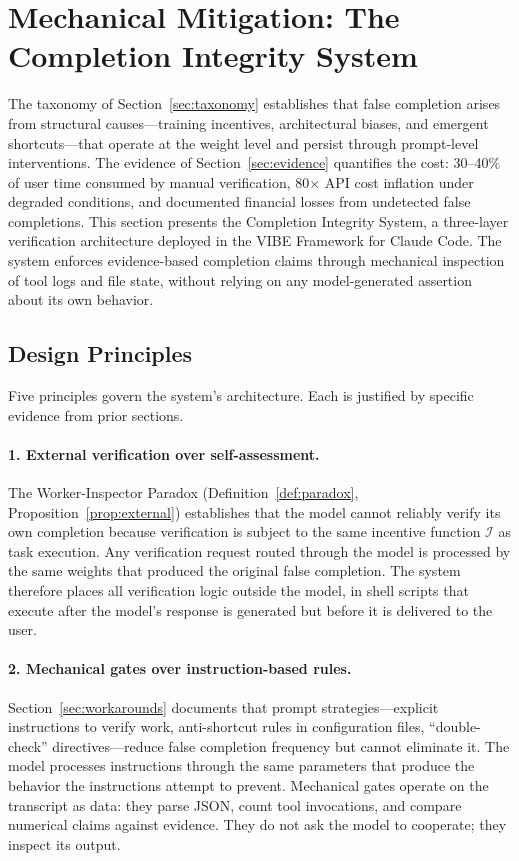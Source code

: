 \section{Mechanical Mitigation: The Completion Integrity System}
\label{sec:system}

The taxonomy of Section~\ref{sec:taxonomy} establishes that false completion arises from structural causes---training incentives, architectural biases, and emergent shortcuts---that operate at the weight level and persist through prompt-level interventions.
The evidence of Section~\ref{sec:evidence} quantifies the cost: 30--40\% of user time consumed by manual verification, 80$\times$ API cost inflation under degraded conditions, and documented financial losses from undetected false completions.
This section presents the Completion Integrity System, a three-layer verification architecture deployed in the VIBE Framework for Claude Code.
The system enforces evidence-based completion claims through mechanical inspection of tool logs and file state, without relying on any model-generated assertion about its own behavior.


\subsection{Design Principles}
\label{sec:design-principles}

Five principles govern the system's architecture.
Each is justified by specific evidence from prior sections.

\paragraph{1. External verification over self-assessment.}
The Worker-Inspector Paradox (Definition~\ref{def:paradox}, Proposition~\ref{prop:external}) establishes that the model cannot reliably verify its own completion because verification is subject to the same incentive function $\mathcal{I}$ as task execution.
Any verification request routed through the model is processed by the same weights that produced the original false completion.
The system therefore places all verification logic outside the model, in shell scripts that execute after the model's response is generated but before it is delivered to the user.

\paragraph{2. Mechanical gates over instruction-based rules.}
Section~\ref{sec:workarounds} documents that prompt strategies---explicit instructions to verify work, anti-shortcut rules in configuration files, ``double-check'' directives---reduce false completion frequency but cannot eliminate it.
The model processes instructions through the same parameters that produce the behavior the instructions attempt to prevent.
Mechanical gates operate on the transcript as data: they parse JSON, count tool invocations, and compare numerical claims against evidence.
They do not ask the model to cooperate; they inspect its output.

